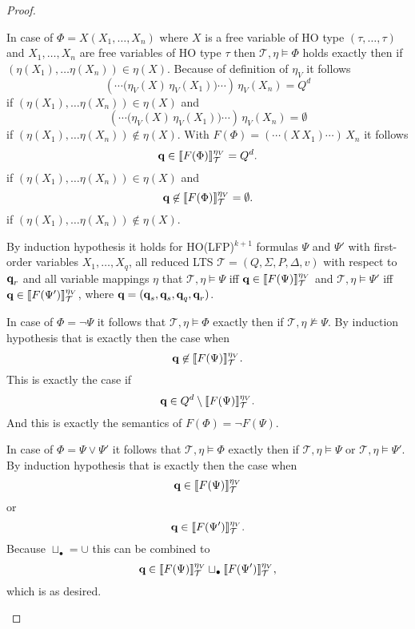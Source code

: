 \begin{proof}
\begin{compactitem}
        \item In case of $\Phi = X(X_1, \dots, X_n)$ where $X$ is a free variable of HO type $(\tau, \dots,
        \tau)$ and $X_1, \dots, X_n$ are free variables of HO type $\tau$ then $\mathcal{T}, \eta \models \Phi$
        holds exactly then if $(\eta(X_1), \dots \eta(X_n)) \in \eta(X)$. Because of definition of $\eta_V$ it follows
        \[(\dotsb\big(\eta_V(X)\,\eta_V(X_1)\big)\dotsb)\,\eta_V(X_n) = Q^d\]
        if $(\eta(X_1), \dots \eta(X_n)) \in \eta(X)$ and
        \[(\dotsb\big(\eta_V(X)\,\eta_V(X_1)\big)\dotsb)\,\eta_V(X_n) = \emptyset\]
        if $(\eta(X_1), \dots \eta(X_n)) \not\in \eta(X)$. With $F(\Phi) = (\dotsb (X\,X_1)\dotsb)\,X_n$
        it follows
        \[ \emph{q} \in \llbracket F(\Phi) \rrbracket^{\eta_V}_\mathcal{T} = Q^d.\]
        if $(\eta(X_1), \dots \eta(X_n))\in \eta(X)$ and
        \[ \emph{q} \not\in \llbracket F(\Phi)
        \rrbracket^{\eta_V}_\mathcal{T} = \emptyset.\]
        if $(\eta(X_1), \dots \eta(X_n)) \not\in \eta(X)$.
    \end{compactitem}
    
    By induction hypothesis it holds for HO(LFP)$^{k+1}$ formulas $\Psi$ and $\Psi'$ with first-order variables $X_1,
    \dots, X_q$, all reduced LTS $\mathcal{T} = (Q, \Sigma, P,
    \Delta, v)$ with respect to $\emph{q}_r$ and all variable mappings $\eta$  that $\mathcal{T}, \eta \models \Psi$ iff $\emph{q} \in \llbracket
   F(\Psi)\rrbracket^{\eta_V}_{\mathcal{T}}$ and $\mathcal{T}, \eta \models \Psi'$ iff $\emph{q} \in \llbracket
   F(\Psi')\rrbracket^{\eta_V}_{\mathcal{T}}$, where $\emph{q} =
    (\emph{q}_s, \emph{q}_s, \emph{q}_q, \emph{q}_r)$.
    
    \begin{compactitem}
        \item In case of $\Phi = \neg \Psi$ it follows that $\mathcal{T}, \eta \models \Phi$ exactly then if
        $\mathcal{T}, \eta \not\models \Psi$. By induction hypothesis that is exactly then the case when
        \[ \emph{q} \not\in \llbracket F(\Psi) \rrbracket^{\eta_V}_\mathcal{T}.\]
        This is exactly the case if
        \[ \emph{q} \in Q^d \setminus \llbracket F(\Psi) \rrbracket^{\eta_V}_\mathcal{T}.\]
        And this is exactly the semantics of $F(\Phi) = \neg F(\Psi)$.

        \item In case of $\Phi = \Psi \vee \Psi'$ it follows that $\mathcal{T}, \eta \models \Phi$ exactly then if
        $\mathcal{T}, \eta \models \Psi$ or $\mathcal{T}, \eta \models \Psi'$. By induction hypothesis that is
        exactly then the case when
        \[\emph{q} \in \llbracket F
        (\Psi) \rrbracket^{\eta_V}_\mathcal{T}\]
        or
        \[\emph{q} \in \llbracket F
        (\Psi') \rrbracket^{\eta_V}_\mathcal{T}.\]
        Because $\sqcup_{\bullet} = \cup$ this can be combined to
        \[\emph{q} \in \llbracket F
        (\Psi) \rrbracket^{\eta_V}_\mathcal{T} \sqcup_\bullet \llbracket F
        (\Psi') \rrbracket^{\eta_V}_\mathcal{T},\]
        which is as desired.


\end{compactitem}
\end{proof}
